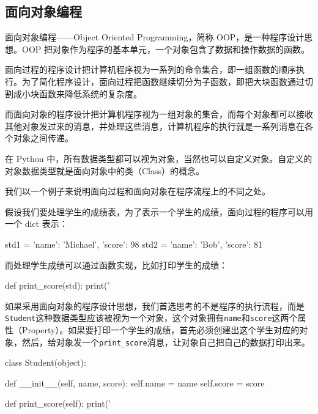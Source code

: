\hypertarget{ux9762ux5411ux5bf9ux8c61ux7f16ux7a0b}{%
\subsection{面向对象编程}\label{ux9762ux5411ux5bf9ux8c61ux7f16ux7a0b}}

面向对象编程------Object Oriented Programming，简称
OOP，是一种程序设计思想。OOP
把对象作为程序的基本单元，一个对象包含了数据和操作数据的函数。

面向过程的程序设计把计算机程序视为一系列的命令集合，即一组函数的顺序执行。为了简化程序设计，面向过程把函数继续切分为子函数，即把大块函数通过切割成小块函数来降低系统的复杂度。

而面向对象的程序设计把计算机程序视为一组对象的集合，而每个对象都可以接收其他对象发过来的消息，并处理这些消息，计算机程序的执行就是一系列消息在各个对象之间传递。

在 Python
中，所有数据类型都可以视为对象，当然也可以自定义对象。自定义的对象数据类型就是面向对象中的类（Class）的概念。

我们以一个例子来说明面向过程和面向对象在程序流程上的不同之处。

假设我们要处理学生的成绩表，为了表示一个学生的成绩，面向过程的程序可以用一个
dict 表示：

\begin{pythoncode}
std1 = { 'name': 'Michael', 'score': 98 }
std2 = { 'name': 'Bob', 'score': 81 }
\end{pythoncode}

而处理学生成绩可以通过函数实现，比如打印学生的成绩：

\begin{pythoncode}
def print_score(std):
    print('%
\end{pythoncode}

如果采用面向对象的程序设计思想，我们首选思考的不是程序的执行流程，而是\texttt{Student}这种数据类型应该被视为一个对象，这个对象拥有\texttt{name}和\texttt{score}这两个属性（Property）。如果要打印一个学生的成绩，首先必须创建出这个学生对应的对象，然后，给对象发一个\texttt{print\_score}消息，让对象自己把自己的数据打印出来。

\begin{pythoncode}
class Student(object):

    def __init__(self, name, score):
        self.name = name
        self.score = score

    def print_score(self):
        print('%
\end{pythoncode}

